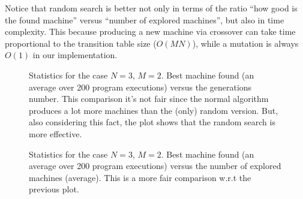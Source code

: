 \documentclass{report}
\begin{document}
Notice that random search is better not only in terms of the ratio ``how good is the found machine'' versus ``number of explored machines'', but also in time complexity. This because producing a new machine via crossover can take time proportional to the transition table size (\ie $O(MN)$), while a mutation is always $O(1)$ in our implementation.

\begin{figure}[t]
\centering
{}
\caption[]{Statistics for the case $N=3$, $M=2$. Best machine found (an average over 200 program executions) versus the generations number. This comparison it's not fair since the normal algorithm produces a lot more machines than the (only) random version. But, also considering this fact, the plot shows that the random search is more effective.}
\label{plot32}
\end{figure}


\begin{figure}[b]
\centering
{}
\caption[]{Statistics for the case $N=3$, $M=2$. Best machine found (an average over 200 program executions) versus the number of explored machines (average). This is a more fair comparison w.r.t the previous plot.}
\label{plot32good}
\end{figure}
\end{document}
